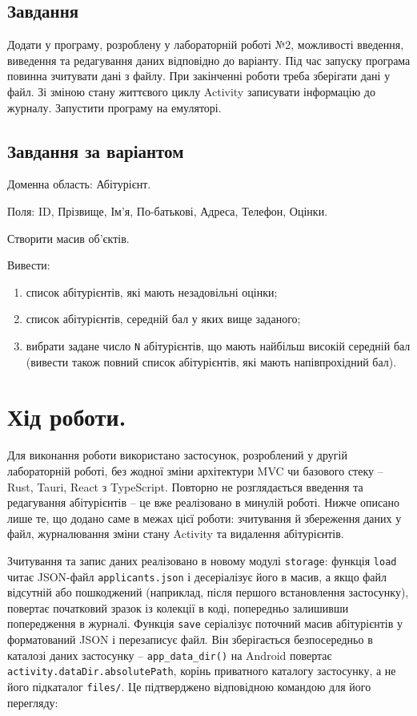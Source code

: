 \documentclass[14pt, a4paper]{extreport}
\begin{document}
	\subsection*{Завдання}
	
	Додати у програму, розроблену у лабораторній роботі №2, можливості введення, виведення та редагування даних відповідно до варіанту. Під час запуску програма повинна зчитувати дані з файлу. При закінченні роботи треба зберігати дані у файл. Зі зміною стану життєвого циклу Activity записувати інформацію до журналу. Запустити програму на емуляторі.
	
	\subsection*{Завдання за варіантом}
	
	Доменна область: Абітурієнт. 
	
	Поля:  ID, Прізвище, Ім'я, По-батькові, Адреса, Телефон, Оцінки. 
	
	Створити масив об'єктів. 
	
	Вивести:
	
	\begin{enumerate}[label=\alph*.]
		\item список абітурієнтів, які мають незадовільні оцінки;
		
		\item список абітурієнтів, середній бал у яких вище заданого;
		
		\item вибрати задане число \texttt{N} абітурієнтів, що мають найбільш високій середній бал (вивести також повний список абітурієнтів, які мають напівпрохідний бал).
	\end{enumerate}
	
	\section*{Хід роботи.}

	Для виконання роботи використано застосунок, розроблений у другій лабораторній роботі, без жодної зміни архітектури MVC чи базового стеку -- Rust, Tauri, React з TypeScript. Повторно не розглядається введення та редагування абітурієнтів -- це вже реалізовано в минулій роботі. Нижче описано лише те, що додано саме в межах цієї роботи: зчитування й збереження даних у файл, журналювання зміни стану Activity та видалення абітурієнтів.

	Зчитування та запис даних реалізовано в новому модулі \texttt{storage}: функція \texttt{load} читає JSON-файл \texttt{applicants.json} і десеріалізує його в масив, а якщо файл відсутній або пошкоджений (наприклад, після першого встановлення застосунку), повертає початковий зразок із колекції в коді, попередньо залишивши попередження в журналі. Функція \texttt{save} серіалізує поточний масив абітурієнтів у форматований JSON і перезаписує файл.  Він зберігається безпосередньо в каталозі даних застосунку -- \texttt{app\_data\_dir()} на Android повертає \texttt{activity.dataDir.absolutePath}, корінь приватного каталогу застосунку, а не його підкаталог \texttt{files/}.  Це підтверджено відповідною командою для його перегляду:
	
\end{document}
